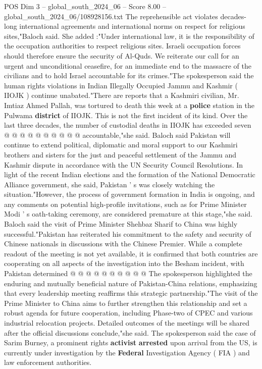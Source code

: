 \begin{textsample}{POS Dim 3 – global\_south\_2024\_06 – Score 8.00 – global\_south\_2024\_06/108928156.txt}
The reprehensible act violates decades-long international agreements and international norms on respect for religious sites,"Baloch said.
She added :"Under international law, it is the responsibility of the occupation authorities to respect religious sites.
Israeli occupation forces should therefore ensure the security of Al-Quds.
We reiterate our call for an urgent and unconditional ceasefire, for an immediate end to the massacre of the civilians and to hold Israel accountable for its crimes."The spokesperson said the human rights violations in Indian Illegally Occupied Jammu and Kashmir ( IIOJK ) continue unabated."There are reports that a Kashmiri civilian, Mr.
Imtiaz Ahmed Pallah, was tortured to death this week at a \textbf{police} station in the Pulwama \textbf{district} of IIOJK.
This is not the first incident of its kind.
Over the last three decades, the number of custodial deaths in IIOJK has exceeded seven @ @ @ @ @ @ @ @ @ @ accountable,"she said.
Baloch said Pakistan will continue to extend political, diplomatic and moral support to our Kashmiri brothers and sisters for the just and peaceful settlement of the Jammu and Kashmir dispute in accordance with the UN Security Council Resolutions.
In light of the recent Indian elections and the formation of the National Democratic Alliance government, she said, Pakistan ' s was closely watching the situation."However, the process of government formation in India is ongoing, and any comments on potential high-profile invitations, such as for Prime Minister Modi ' s oath-taking ceremony, are considered premature at this stage,"she said.
Baloch said the visit of Prime Minister Shehbaz Sharif to China was highly successful."Pakistan has reiterated his commitment to the safety and security of Chinese nationals in discussions with the Chinese Premier.
While a complete readout of the meeting is not yet available, it is confirmed that both countries are cooperating on all aspects of the investigation into the Besham incident, with Pakistan determined @ @ @ @ @ @ @ @ @ @ The spokesperson highlighted the enduring and mutually beneficial nature of Pakistan-China relations, emphasizing that every leadership meeting reaffirms this strategic partnership."The visit of the Prime Minister to China aims to further strengthen this relationship and set a robust agenda for future cooperation, including Phase-two of CPEC and various industrial relocation projects.
Detailed outcomes of the meetings will be shared after the official discussions conclude,"she said.
The spokesperson said the case of Sarim Burney, a prominent rights \textbf{activist} \textbf{arrested} upon arrival from the US, is currently under investigation by the \textbf{Federal} Investigation Agency ( FIA ) and law enforcement authorities.

\end{textsample}
